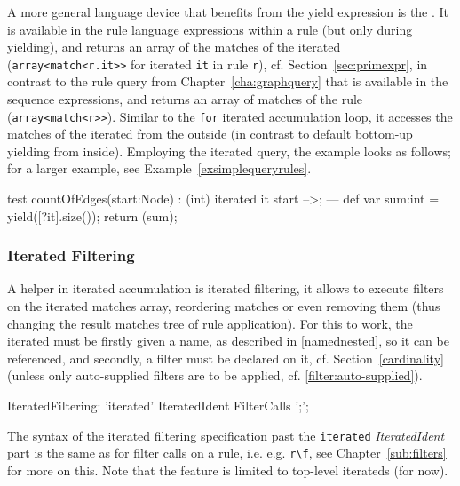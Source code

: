 A more general language device that benefits from the yield expression is the . 
It is available in the rule language expressions within a rule (but only during yielding), and returns an array of the matches of the iterated (\texttt{array<match<r.it>>} for iterated \texttt{it} in rule \texttt{r}), cf. Section~\ref{sec:primexpr}, in contrast to the rule query from Chapter~\ref{cha:graphquery} that is available in the sequence expressions, and returns an array of matches of the rule (\texttt{array<match<r>>}).
Similar to the \texttt{for} iterated accumulation loop, it accesses the matches of the iterated from the outside (in contrast to default bottom-up yielding from inside).
Employing the iterated query, the example looks as follows; for a larger example, see Example~\ref{exsimplequeryrules}.

\begin{example}
  \begin{grgen}
test countOfEdges(start:Node) : (int)
{
	iterated it {
		start -->;
	} 
---
	def var sum:int = yield([?it].size());
	return (sum);
}
  \end{grgen}
\end{example}
	
\pagebreak
	
\subsubsection*{Iterated Filtering}\label{sub:iteratedfilter}

A helper in iterated accumulation is iterated filtering, it allows to execute filters on the iterated matches array, reordering matches or even removing them (thus changing the result matches tree of rule application).
For this to work, the iterated must be firstly given a name, as described in \ref{namednested}, so it can be referenced, and secondly, a filter must be declared on it, cf. Section~\ref{cardinality} (unless only auto-supplied filters are to be applied, cf. \ref{filter:auto-supplied}).

\begin{rail}
  IteratedFiltering: 
    'iterated' IteratedIdent FilterCalls ';';
\end{rail}

The syntax of the iterated filtering specification past the \texttt{iterated} \emph{IteratedIdent} part is the same as for filter calls on a rule, i.e. e.g. \verb#r\f#, see Chapter~\ref{sub:filters} for more on this.
Note that the feature is limited to top-level iterateds (for now).

